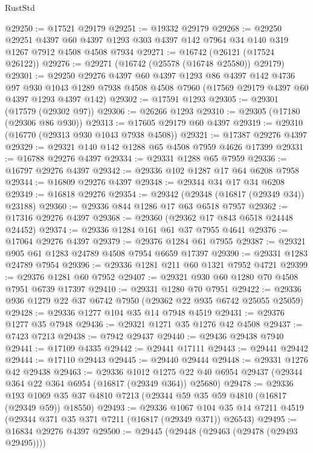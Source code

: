\begin{lexlean}{RustStd}
\begin{coremodule}
{\begin{coremodule}
{{{{{{{{{{{{{{{{{{{{{{{{{{{{{{{{{{{{{{{{{{{{{{{{{{{{{{{@29250 := @17521 @29179
@29251 := @19332 @29179
@29268 := @29250
    @29251
    @4397
    @60
    @4397
    @1293
    @303
    @4397
    @142
    @7964
    @34
    @140
    @319
    @1267
    @7912
    @4508
    @4508
    @7934
@29271 := @16742 (@26121 (@17524 @26122))
@29276 := @29271 (@16742 (@25578 (@16748 @25580)) @29179)
@29301 := @29250
    @29276
    @4397
    @60
    @4397
    @1293
    @86
    @4397
    @142
    @4736
    @97
    @930
    @1043
    @1289
    @7938
    @4508
    @4508
    @7960
    (@17569 @29179 @4397 @60 @4397 @1293 @4397 @142)
@29302 := @17591 @1293
@29305 := @29301 (@17579 (@29302 @97))
@29306 := @26266 @1293
@29310 := @29305 (@17180 (@29306 @86 @930))
@29313 := @17605 @29179 @60 @4397
@29319 := @29310 (@16770 (@29313 @930 @1043 @7938 @4508))
@29321 := @17387 @29276 @4397
@29329 := @29321 @140 @142 @1288 @65 @4508 @7959 @4626 @17399
@29331 := @16788 @29276 @4397
@29334 := @29331 @1288 @65 @7959
@29336 := @16797 @29276 @4397
@29342 := @29336 @102 @1287 @17 @64 @6208 @7958
@29344 := @16809 @29276 @4397
@29348 := @29344 @34 @17 @34 @6208
@29349 := @16818 @29276
@29354 := @29342 (@29348 (@16817 (@29349 @34)) @23188)
@29360 := @29336 @844 @1286 @17 @63 @6518 @7957
@29362 := @17316 @29276 @4397
@29368 := @29360 (@29362 @17 @843 @6518 @24448 @24452)
@29374 := @29336 @1284 @161 @61 @37 @7955 @4641
@29376 := @17064 @29276 @4397
@29379 := @29376 @1284 @61 @7955
@29387 := @29321 @905 @61 @1283 @24789 @4508 @7954 @6659 @17397
@29390 := @29331 @1283 @24789 @7954
@29396 := @29336 @1281 @211 @60 @1321 @7952 @4721
@29399 := @29376 @1281 @60 @7952
@29407 := @29321 @930 @60 @1280 @70 @4508 @7951 @6739 @17397
@29410 := @29331 @1280 @70 @7951
@29422 := @29336 @936 @1279 @22 @37 @6742 @7950 (@29362 @22 @935 @6742 @25055 @25059)
@29428 := @29336 @1277 @104 @35 @14 @7948 @4519
@29431 := @29376 @1277 @35 @7948
@29436 := @29321 @1271 @35 @1276 @42 @4508
@29437 := @7423 @7213
@29438 := @7942 @29437
@29440 := @29436 @29438 @7940
@29441 := @17109 @4335
@29442 := @29441 @17111
@29443 := @29441 @29442
@29444 := @17110 @29443
@29445 := @29440 @29444
@29448 := @29331 @1276 @42 @29438
@29463 := @29336
    @1012
    @1275
    @22
    @40
    @6954
    @29437
    (@29344 @364 @22 @364 @6954 (@16817 (@29349 @364)) @25680)
@29478 := @29336
    @193
    @1069
    @35
    @37
    @4810
    @7213
    (@29344 @59 @35 @59 @4810 (@16817 (@29349 @59)) @18550)
@29493 := @29336
    @1067
    @104
    @35
    @14
    @7211
    @4519
    (@29344 @371 @35 @371 @7211 (@16817 (@29349 @371)) @26543)
@29495 := @16834 @29276 @4397
@29500 := @29445 (@29448 (@29463 (@29478 (@29493 @29495))))
}}}}}}}}}}}}}}}}}}}}}}}}}}}}}}}}}}}}}}}}}}}}}}}}}}}}}}}
\end{coremodule}}
\end{coremodule}
\end{lexlean}
